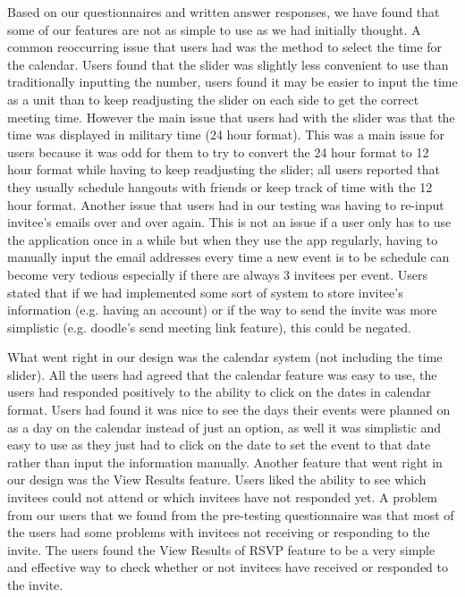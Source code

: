 \documentclass{sigchi}
\begin{document}
Based on our questionnaires and written answer responses, we have found that some of our features are not as simple to use as we had initially thought. A common reoccurring issue that users had was the method to select the time for the calendar. Users found that the slider was slightly less convenient to use than traditionally inputting the number, users found it may be easier to input the time as a unit than to keep readjusting the slider on each side to get the correct meeting time. However the main issue that users had with the slider was that the time was displayed in military time (24 hour format). This was a main issue for users because it was odd for them to try to convert the 24 hour format to 12 hour format while having to keep readjusting the slider; all users reported that they usually schedule hangouts with friends or keep track of time with the 12 hour format. Another issue that users had in our testing was having to re-input invitee's emails over and over again. This is not an issue if a user only has to use the application once in a while but when they use the app regularly, having to manually input the email addresses every time a new event is to be schedule can become very tedious especially if there are always 3 invitees per event. Users stated that if we had implemented some sort of system to store invitee's information (e.g. having an account) or if the way to send the invite was more simplistic (e.g. doodle's send meeting link feature), this could be negated.

What went right in our design was the calendar system (not including the time slider). All the users had agreed that the calendar feature was easy to use, the users had responded positively to the ability to click on the dates in calendar format. Users had found it was nice to see the days their events were planned on as a day on the calendar instead of just an option, as well it was simplistic and easy to use as they just had to click on the date to set the event to that date rather than input the information manually. Another feature that went right in our design was the View Results feature. Users liked the ability to see which invitees could not attend or which invitees have not responded yet. A problem from our users that we found from the pre-testing questionnaire was that most of the users had some problems with invitees not receiving or responding to the invite. The users found the View Results of RSVP feature to be a very simple and effective way to check whether or not invitees have received or responded to the invite.
\end{document}

